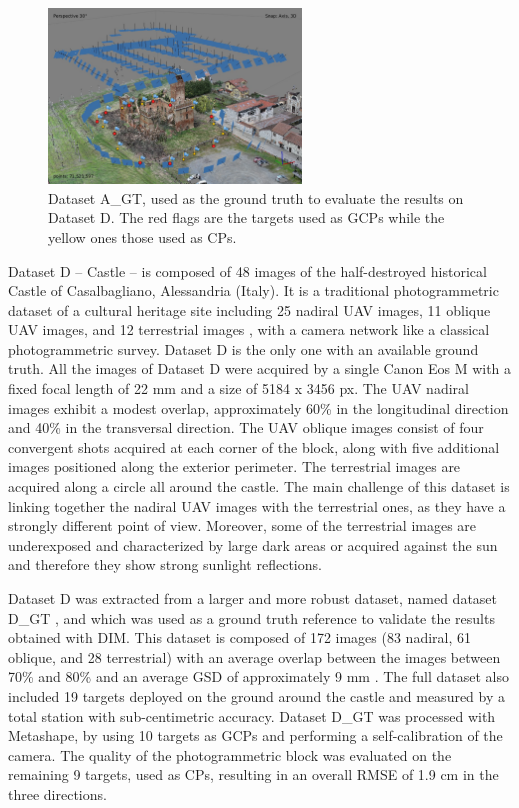 \begin{figure}
  \centering
    \includegraphics[width=0.6\textwidth]{castle_gt}
  \caption{Dataset A\_GT, used as the ground truth to evaluate the results on Dataset D. The red flags are the targets used as GCPs while the yellow ones those used as CPs.}
  \label{fig:5:castle_gt}
\end{figure}

Dataset D – Castle – is composed of 48 images of the half-destroyed historical Castle of Casalbagliano, Alessandria (Italy). 
It is a traditional photogrammetric dataset of a cultural heritage site including 25 nadiral UAV images, 11 oblique UAV images, and 12 terrestrial images , with a camera network like a classical photogrammetric survey. 
Dataset D is the only one with an available ground truth. All the images of Dataset D were acquired by a single Canon Eos M with a fixed focal length of 22 mm and a size of 5184 x 3456 px.
The UAV nadiral images exhibit a modest overlap, approximately 60\% in the longitudinal direction and 40\% in the transversal direction. 
The UAV oblique images consist of four convergent shots acquired at each corner of the block, along with five additional images positioned along the exterior perimeter. 
The terrestrial images are acquired along a circle all around the castle. 
The main challenge of this dataset is linking together the nadiral UAV images with the terrestrial ones, as they have a strongly different point of view. 
Moreover, some of the terrestrial images are underexposed and characterized by large dark areas or acquired against the sun and therefore they show strong sunlight reflections. 

Dataset D was extracted from a larger and more robust dataset, named dataset D\_GT , and which was used as a ground truth reference to validate the results obtained with DIM.
This dataset is composed of 172 images (83 nadiral, 61 oblique, and 28 terrestrial) with an average overlap between the images between 70\% and 80\% and an average GSD of approximately 9 mm \cite{Gagliolo2017_uav_conservation_histo, gagliolo2018_parameter_optim}. 
The full dataset also included 19 targets deployed on the ground around the castle and measured by a total station with sub-centimetric accuracy. Dataset D\_GT was processed with Metashape, by using 10 targets as GCPs and performing a self-calibration of the camera. The quality of the photogrammetric block was evaluated on the remaining 9 targets, used as CPs, resulting in an overall RMSE of 1.9 cm in the three directions.

